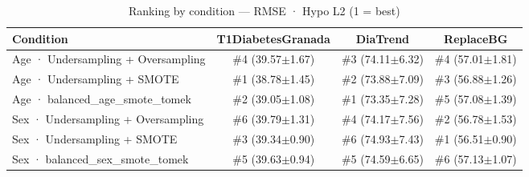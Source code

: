 \begin{table}[htbp]
\centering
\small
\caption{Ranking by condition — RMSE · Hypo L2  (1 = best)}
\label{tab:ranking_rmse_tbr_2_family_size_same_size}
\begin{tabular}{lccc}
\toprule
\textbf{Condition} & \textbf{T1DiabetesGranada} & \textbf{DiaTrend} & \textbf{ReplaceBG} \\
\midrule
Age · Undersampling + Oversampling & \#4 (39.57$\pm$1.67) & \#3 (74.11$\pm$6.32) & \#4 (57.01$\pm$1.81) \\
Age · Undersampling + SMOTE & \#1 (38.78$\pm$1.45) & \#2 (73.88$\pm$7.09) & \#3 (56.88$\pm$1.26) \\
Age · balanced_age_smote_tomek & \#2 (39.05$\pm$1.08) & \#1 (73.35$\pm$7.28) & \#5 (57.08$\pm$1.39) \\
\midrule
Sex · Undersampling + Oversampling & \#6 (39.79$\pm$1.31) & \#4 (74.17$\pm$7.56) & \#2 (56.78$\pm$1.53) \\
Sex · Undersampling + SMOTE & \#3 (39.34$\pm$0.90) & \#6 (74.93$\pm$7.43) & \#1 (56.51$\pm$0.90) \\
Sex · balanced_sex_smote_tomek & \#5 (39.63$\pm$0.94) & \#5 (74.59$\pm$6.65) & \#6 (57.13$\pm$1.07) \\
\bottomrule
\end{tabular}
\end{table}